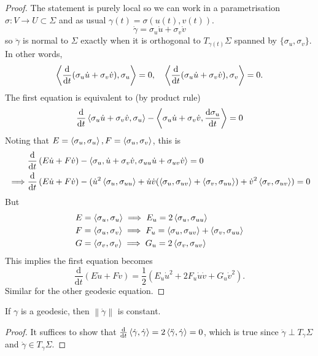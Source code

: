 \documentclass[a4paper]{article}
\begin{document}
\begin{proof}
	The statement is purely local so we can work in a parametrisation $ \sigma:V\to U \subset \Sigma $ and as usual $ \gamma(t) = \sigma(u(t),v(t)) $.
	\[
		\dot{\gamma} = \sigma_u \dot{u} + \sigma_v \dot{v}
	\]
	so $ \ddot{\gamma} $ is normal to $\Sigma$ exactly when it is orthogonal to $ T_{\gamma(t)}\Sigma $ spanned by $ \{\sigma_u,\sigma_v\} $. In other words,
	\[
		\left\langle{\dv{}{t} \qty( \sigma_u \dot{u} + \sigma_v \dot{v}),\sigma_u}\right\rangle = 0,\quad 
		\left\langle{\dv{}{t} \qty( \sigma_u \dot{u} + \sigma_v \dot{v}),\sigma_v}\right\rangle = 0.
	\]
	The first equation is equivalent to (by product rule)
	\[
		\dv{}{t} \left\langle{\sigma_u \dot{u} + \sigma_v \dot{v},\sigma_u}\right\rangle - \left\langle{\sigma_u \dot{u} + \sigma_v \dot{v}, \dv{\sigma_u}{t} }\right\rangle = 0
	\]
	Noting that $ E = \left\langle{\sigma_u, \sigma_u}\right\rangle , F = \left\langle{\sigma_u,\sigma_v}\right\rangle$, this is 
	\begin{align*}
		&\frac{\mathrm{d}}{\mathrm{d}t} \left( E\dot{u}+F\dot{v} \right) -\left\langle{\sigma_u, \dot{u}+\sigma_v \dot{v}, \sigma_{uu}\dot{u}+\sigma_{uv} \dot{v}}\right\rangle = 0\\ 
		\implies & \frac{\mathrm{d}}{\mathrm{d}t} \left( E\dot{u}+F\dot{v} \right) - (\dot{u}^2 \left\langle{\sigma_u,\sigma_{uu}}\right\rangle + \dot{u}\dot{v} (\left\langle{\sigma_u,\sigma_{uv}}\right\rangle+\left\langle{\sigma_v,\sigma_{uu}}\right\rangle)+\dot{v}^2\left\langle{\sigma_v,\sigma_{uv}}\right\rangle)=0
	\end{align*}
	But 
	\begin{align*}
		& E = \left\langle{\sigma_u,\sigma_u}\right\rangle \implies E_u = 2\left\langle{\sigma_u,\sigma_{uu}}\right\rangle\\ 
		& F = \left\langle{\sigma_u,\sigma_v}\right\rangle \implies F_u = \left\langle{\sigma_u,\sigma_{uv}}\right\rangle + \left\langle{\sigma_v, \sigma_{uu}}\right\rangle\\ 
		& G = \left\langle{\sigma_v,\sigma_v}\right\rangle \implies G_u = 2 \left\langle{\sigma_v,\sigma_{uv}}\right\rangle
	\end{align*}
	This implies the first equation becomes 
	\[
		\frac{\mathrm{d}}{\mathrm{d}t}(E \dot{u} + F \dot{v}) = \frac{1}{2}(E_u \dot{u}^2 + 2 F_u \dot{u}\dot{v} + G_u \dot{v}^2) . 
	\]
	Similar for the other geodesic equation. 
\end{proof}

\begin{corollary}
	If $\gamma$ is a geodesic, then $ \left\| \dot{\gamma} \right\|  $ is constant. 
\end{corollary}
\begin{proof}
	It suffices to show that $ \dv{}{t}\left\langle{\dot{\gamma},\dot{\gamma}}\right\rangle= 2\left\langle{\ddot{\gamma},\dot{\gamma}}\right\rangle=0 $, which is true since $ \ddot{\gamma} \perp T_\gamma\Sigma $ and $ \dot{\gamma}\in T_\gamma\Sigma $. 
\end{proof}
\end{document}
